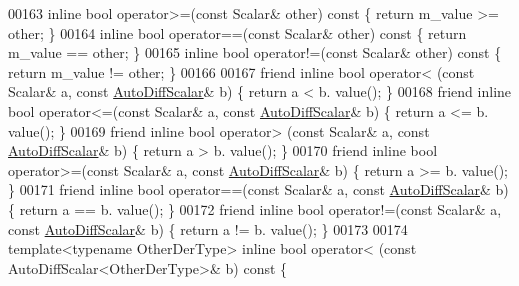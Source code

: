 \begin{DoxyCode}
00163     \textcolor{keyword}{inline} \textcolor{keywordtype}{bool} operator>=(\textcolor{keyword}{const} Scalar& other)\textcolor{keyword}{ const  }\{ \textcolor{keywordflow}{return} m\_value >= other; \}
00164     \textcolor{keyword}{inline} \textcolor{keywordtype}{bool} operator==(\textcolor{keyword}{const} Scalar& other)\textcolor{keyword}{ const  }\{ \textcolor{keywordflow}{return} m\_value == other; \}
00165     \textcolor{keyword}{inline} \textcolor{keywordtype}{bool} operator!=(\textcolor{keyword}{const} Scalar& other)\textcolor{keyword}{ const  }\{ \textcolor{keywordflow}{return} m\_value != other; \}
00166 
00167     \textcolor{keyword}{friend} \textcolor{keyword}{inline} \textcolor{keywordtype}{bool} operator< (\textcolor{keyword}{const} Scalar& a, \textcolor{keyword}{const} \hyperlink{class_eigen_1_1_auto_diff_scalar}{AutoDiffScalar}& b) \{ \textcolor{keywordflow}{return} a <  b.
      value(); \}
00168     \textcolor{keyword}{friend} \textcolor{keyword}{inline} \textcolor{keywordtype}{bool} operator<=(\textcolor{keyword}{const} Scalar& a, \textcolor{keyword}{const} \hyperlink{class_eigen_1_1_auto_diff_scalar}{AutoDiffScalar}& b) \{ \textcolor{keywordflow}{return} a <= b.
      value(); \}
00169     \textcolor{keyword}{friend} \textcolor{keyword}{inline} \textcolor{keywordtype}{bool} operator> (\textcolor{keyword}{const} Scalar& a, \textcolor{keyword}{const} \hyperlink{class_eigen_1_1_auto_diff_scalar}{AutoDiffScalar}& b) \{ \textcolor{keywordflow}{return} a >  b.
      value(); \}
00170     \textcolor{keyword}{friend} \textcolor{keyword}{inline} \textcolor{keywordtype}{bool} operator>=(\textcolor{keyword}{const} Scalar& a, \textcolor{keyword}{const} \hyperlink{class_eigen_1_1_auto_diff_scalar}{AutoDiffScalar}& b) \{ \textcolor{keywordflow}{return} a >= b.
      value(); \}
00171     \textcolor{keyword}{friend} \textcolor{keyword}{inline} \textcolor{keywordtype}{bool} operator==(\textcolor{keyword}{const} Scalar& a, \textcolor{keyword}{const} \hyperlink{class_eigen_1_1_auto_diff_scalar}{AutoDiffScalar}& b) \{ \textcolor{keywordflow}{return} a == b.
      value(); \}
00172     \textcolor{keyword}{friend} \textcolor{keyword}{inline} \textcolor{keywordtype}{bool} operator!=(\textcolor{keyword}{const} Scalar& a, \textcolor{keyword}{const} \hyperlink{class_eigen_1_1_auto_diff_scalar}{AutoDiffScalar}& b) \{ \textcolor{keywordflow}{return} a != b.
      value(); \}
00173 
00174     \textcolor{keyword}{template}<\textcolor{keyword}{typename} OtherDerType> \textcolor{keyword}{inline} \textcolor{keywordtype}{bool} operator< (const AutoDiffScalar<OtherDerType>& b) \textcolor{keyword}{const}  \{ \textcolor{keywordflow}{
}
\end{DoxyCode}
